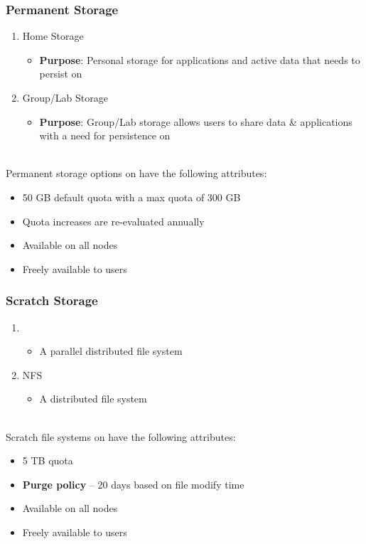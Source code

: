 \begin{frame}
  \frametitle{Permanent Storage}
  \begin{enumerate}
  \item Home Storage
    \begin{itemize}
    \item {\textbf{Purpose}}: Personal storage for applications and active data that needs to persist on {\mana}
    \end{itemize}
  \item Group/Lab Storage
    \begin{itemize}
    \item {\textbf{Purpose}}: Group/Lab storage allows users to share data \& applications with a need for persistence on {\mana}
    \end{itemize}
  \end{enumerate}
~\\
  Permanent storage options on {\mana} have the following attributes:
  \begin{itemize}
  \item 50 GB default quota with a max quota of 300 GB
  \item Quota increases are re-evaluated annually
  \item Available on all nodes
  \item Freely available to users
  \end{itemize}

\end{frame}


\begin{frame}
  \frametitle{Scratch Storage}
  \begin{enumerate}
    \item {\lustre}
      \begin{itemize}
			\item A parallel distributed file system 
      \end{itemize}
    \item NFS
      \begin{itemize}
			\item A distributed file system 
      \end{itemize}
  \end{enumerate}
~\\
  Scratch file systems on {\mana} have the following attributes:
  \begin{itemize}
	\item 5 TB quota
  \item \textbf{Purge policy} -- 20 days based on file modify time
  \item Available on all nodes
  \item Freely available to users
  \end{itemize}

\end{frame}



